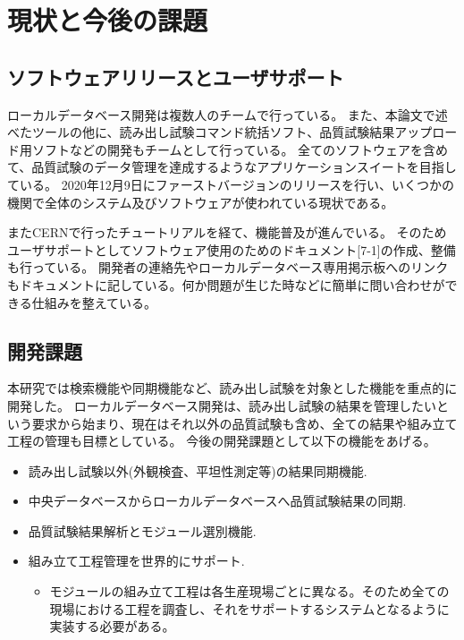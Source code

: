 \section{現状と今後の課題}
\subsection{ソフトウェアリリースとユーザサポート}
ローカルデータベース開発は複数人のチームで行っている。
また、本論文で述べたツールの他に、読み出し試験コマンド統括ソフト、品質試験結果アップロード用ソフトなどの開発もチームとして行っている。
全てのソフトウェアを含めて、品質試験のデータ管理を達成するようなアプリケーションスイートを目指している。
2020年12月9日にファーストバージョンのリリースを行い、いくつかの機関で全体のシステム及びソフトウェアが使われている現状である。

またCERNで行ったチュートリアルを経て、機能普及が進んでいる。
そのためユーザサポートとしてソフトウェア使用のためのドキュメント[7-1]の作成、整備も行っている。
開発者の連絡先やローカルデータベース専用掲示板へのリンクもドキュメントに記している。何か問題が生じた時などに簡単に問い合わせができる仕組みを整えている。

\subsection{開発課題}
本研究では検索機能や同期機能など、読み出し試験を対象とした機能を重点的に開発した。
ローカルデータベース開発は、読み出し試験の結果を管理したいという要求から始まり、現在はそれ以外の品質試験も含め、全ての結果や組み立て工程の管理も目標としている。
今後の開発課題として以下の機能をあげる。
\begin{itemize}
  \item 読み出し試験以外(外観検査、平坦性測定等)の結果同期機能.
  \item 中央データベースからローカルデータベースへ品質試験結果の同期.
  \item 品質試験結果解析とモジュール選別機能. 
  \item 組み立て工程管理を世界的にサポート.
  \begin{itemize}
    \item モジュールの組み立て工程は各生産現場ごとに異なる。そのため全ての現場における工程を調査し、それをサポートするシステムとなるように実装する必要がある。
  \end{itemize}
\end{itemize}


